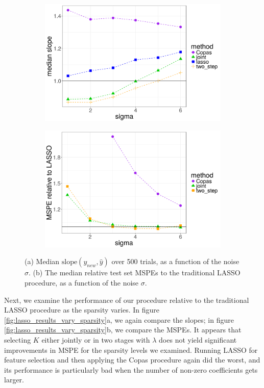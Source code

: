 \documentclass[main]{subfiles}
\begin{document}
\begin{figure}[!h]
	\centering
	\begin{subfigure}[t]{0.45\textwidth}
		\includegraphics[width = \textwidth]{./lasso_figures/slope_vs_sigma.png}
	\end{subfigure}
  \begin{subfigure}[t]{0.45\textwidth}
    \includegraphics[width = \textwidth]{./lasso_figures/mspe_vs_sigma.png}
  \end{subfigure}
  \caption{(a) Median $\text{slope}(y_{new}, \hat y)$ over 500 trials, as a function of the noise $\sigma$. (b)
	The median relative test set MSPEs to the
	traditional LASSO procedure, as a function of the noise $\sigma$. }
	\label{fig:lasso_results_vary_sigma}
\end{figure}

 \par
Next, we examine the performance of our procedure relative to the traditional LASSO procedure as the sparsity varies. In figure
\ref{fig:lasso_results_vary_sparsity}a, we again compare the slopes; in figure \ref{fig:lasso_results_vary_sparsity}b, we
compare the MSPEs. It appears that selecting $K$ either jointly or in two stages with $\lambda$ does not yield significant improvements in MSPE
for the sparsity levels we examined. Running LASSO for feature selection and then applying the Copas procedure again
did the worst, and its performance is particularly bad when the number of non-zero coefficients gets larger.
\end{document}
